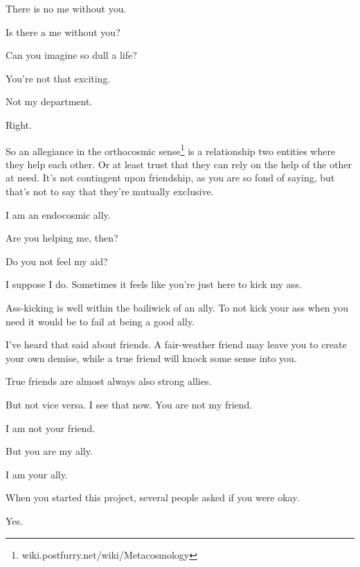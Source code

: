 \begin{paracol}{2}
\begin{leftcolumn}
\begin{ally}
There is no me without you.
\end{ally}
Is there a me without you?

\begin{ally}
Can you imagine so dull a life?
\end{ally}
You're not that exciting.

\begin{ally}
Not my department.
\end{ally}
Right.

So an allegiance in the orthocosmic sense\footnote{wiki.postfurry.net/wiki/Metacosmology} is a relationship two entities where they help each other. Or at least trust that they can rely on the help of the other at need. It's not contingent upon friendship, as you are so fond of saying, but that's not to say that they're mutually exclusive.

\begin{ally}
I am an endocosmic ally.
\end{ally}
Are you helping me, then?

\begin{ally}
Do you not feel my aid?
\end{ally}
I suppose I do. Sometimes it feels like you're just here to kick my ass.

\begin{ally}
Ass-kicking is well within the bailiwick of an ally. To not kick your ass when you need it would be to fail at being a good ally.
\end{ally}
I've heard that said about friends. A fair-weather friend may leave you to create your own demise, while a true friend will knock some sense into you.

\begin{ally}
True friends are almost always also strong allies.
\end{ally}
But not vice versa. I see that now. You are not my friend.

\begin{ally}
I am not your friend.
\end{ally}
But you are my ally.

\begin{ally}
I am your ally.
\end{ally}
\newpage

\label{ally:21}

\begin{ally}
When you started this project, several people asked if you were okay.
\end{ally}
Yes.


\end{leftcolumn}
\end{paracol}
